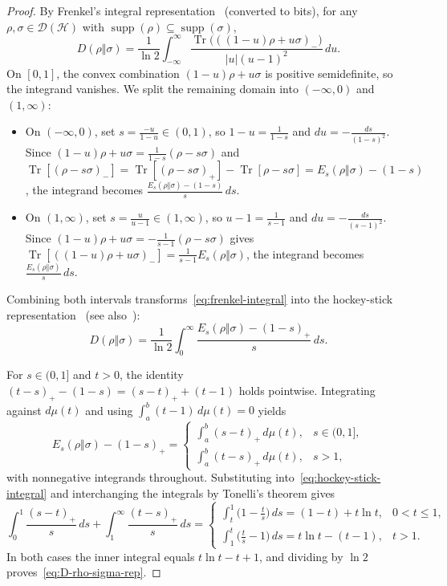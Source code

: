 \documentclass[10pt,a4paper]{article}
\numberwithin{equation}{section}
\theoremstyle{plain}
\theoremstyle{definition}
\theoremstyle{remark}
\DeclareMathOperator{\Tr}{Tr}
\DeclareMathOperator{\supp}{supp}
\newcommand{\cH}{\mathcal{H}}
\newcommand{\cD}{\mathcal{D}}
\begin{document}
\begin{proof}
By Frenkel's integral representation~\cite[Theorem~6]{Frenkel2023} (converted to bits), for any $\rho, \sigma \in \cD(\cH)$ with $\supp(\rho) \subseteq \supp(\sigma)$,
\begin{equation}\label{eq:frenkel-integral}
D(\rho \Vert \sigma) = \frac{1}{\ln 2} \int_{-\infty}^{\infty} \frac{\Tr\!\bigl(((1-u)\rho + u\sigma)_-\bigr)}{\lvert u \rvert (u - 1)^2}\, du.
\end{equation}
On $[0,1]$, the convex combination $(1-u)\rho + u\sigma$ is positive semidefinite, so the integrand vanishes. We split the remaining domain into $(-\infty, 0)$ and $(1,\infty)$:
\begin{itemize}
\item On $(-\infty, 0)$, set $s = \frac{-u}{1-u} \in (0,1)$, so $1-u = \frac{1}{1-s}$ and $du = -\frac{ds}{(1-s)^2}$. Since $(1-u)\rho + u\sigma = \frac{1}{1-s}(\rho - s\sigma)$ and $\Tr[(\rho - s\sigma)_-] = \Tr[(\rho - s\sigma)_+] - \Tr[\rho - s\sigma] = E_s(\rho\Vert\sigma) - (1-s)$, the integrand becomes $\frac{E_s(\rho\Vert\sigma) - (1-s)}{s}\,ds$.
\item On $(1,\infty)$, set $s = \frac{u}{u-1} \in (1,\infty)$, so $u-1 = \frac{1}{s-1}$ and $du = -\frac{ds}{(s-1)^2}$. Since $(1-u)\rho + u\sigma = -\frac{1}{s-1}(\rho - s\sigma)$ gives $\Tr[((1-u)\rho + u\sigma)_-] = \frac{1}{s-1} E_s(\rho\Vert\sigma)$, the integrand becomes $\frac{E_s(\rho\Vert\sigma)}{s}\,ds$.
\end{itemize}
Combining both intervals transforms~\eqref{eq:frenkel-integral} into the hockey-stick representation~\cite{HircheTomamichel2024} (see also~\cite{BertaLamiTomamichel2024}):
\begin{equation}\label{eq:hockey-stick-integral}
D(\rho \Vert \sigma) = \frac{1}{\ln 2} \int_0^{\infty} \frac{E_s(\rho \Vert \sigma) - (1 - s)_+}{s}\, ds.
\end{equation}

For $s \in (0,1]$ and $t > 0$, the identity $(t - s)_+ - (1 - s) = (s - t)_+ + (t - 1)$ holds pointwise. Integrating against $d\mu(t)$ and using $\int_a^b (t - 1)\, d\mu(t) = 0$ yields
\[
E_s(\rho \Vert \sigma) - (1 - s)_+ =
\begin{cases}
\int_a^b (s - t)_+\, d\mu(t), & s \in (0, 1],\\
\int_a^b (t - s)_+\, d\mu(t), & s > 1,
\end{cases}
\]
with nonnegative integrands throughout. Substituting into~\eqref{eq:hockey-stick-integral} and interchanging the integrals by Tonelli's theorem gives
\[
\int_0^1 \frac{(s - t)_+}{s}\, ds + \int_1^{\infty} \frac{(t - s)_+}{s}\, ds =
\begin{cases}
\int_t^1 \bigl(1 - \frac{t}{s}\bigr)\, ds = (1 - t) + t\ln t, & 0 < t \le 1,\\
\int_1^t \bigl(\frac{t}{s} - 1\bigr)\, ds = t\ln t - (t - 1), & t > 1.
\end{cases}
\]
In both cases the inner integral equals $t\ln t - t + 1$, and dividing by $\ln 2$ proves~\eqref{eq:D-rho-sigma-rep}.


\end{proof}
\end{document}
